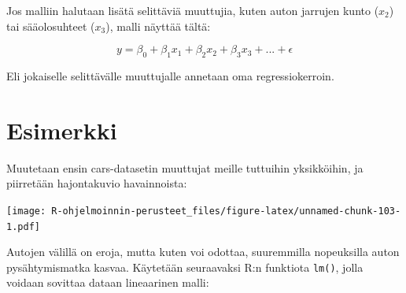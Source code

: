 \documentclass[
]{book}
\newenvironment{Shaded}{\begin{snugshade}}{\end{snugshade}}
\newcommand{\AttributeTok}[1]{\textcolor[rgb]{0.77,0.63,0.00}{#1}}
\newcommand{\CommentTok}[1]{\textcolor[rgb]{0.56,0.35,0.01}{\textit{#1}}}
\newcommand{\FloatTok}[1]{\textcolor[rgb]{0.00,0.00,0.81}{#1}}
\newcommand{\FunctionTok}[1]{\textcolor[rgb]{0.00,0.00,0.00}{#1}}
\newcommand{\NormalTok}[1]{#1}
\newcommand{\OtherTok}[1]{\textcolor[rgb]{0.56,0.35,0.01}{#1}}
\newcommand{\SpecialCharTok}[1]{\textcolor[rgb]{0.00,0.00,0.00}{#1}}
\newcommand{\StringTok}[1]{\textcolor[rgb]{0.31,0.60,0.02}{#1}}
\begin{document}
Jos malliin halutaan lisätä selittäviä muuttujia, kuten auton jarrujen kunto (\(x_2\)) tai sääolosuhteet (\(x_3\)), malli näyttää tältä:

\[y = \beta_0 + \beta_1 x_1 + \beta_2 x_2 + \beta_3 x_3 + ... + \epsilon\]

Eli jokaiselle selittävälle muuttujalle annetaan oma regressiokerroin.

\hypertarget{esimerkki}{%
\section{Esimerkki}\label{esimerkki}}

Muutetaan ensin cars-datasetin muuttujat meille tuttuihin yksikköihin, ja piirretään hajontakuvio havainnoista:

\begin{Shaded}
\end{Shaded}

\texttt{[image: R-ohjelmoinnin-perusteet\_files/figure-latex/unnamed-chunk-103-1.pdf]}

Autojen välillä on eroja, mutta kuten voi odottaa, suuremmilla nopeuksilla auton pysähtymismatka kasvaa. Käytetään seuraavaksi R:n funktiota \texttt{lm()}, jolla voidaan sovittaa dataan lineaarinen malli:

\begin{Shaded}
\end{Shaded}
\end{document}
